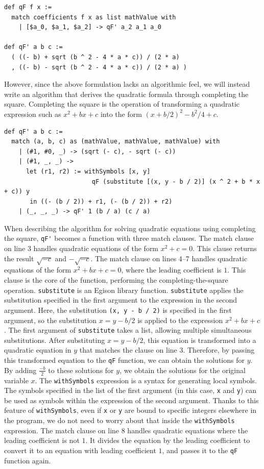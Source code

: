 \begin{lstlisting}[language=egison,numbers=none]
def qF f x :=
  match coefficients f x as list mathValue with
    | [$a_0, $a_1, $a_2] -> qF' a_2 a_1 a_0

def qF' a b c :=
  ( ((- b) + sqrt (b ^ 2 - 4 * a * c)) / (2 * a)
  , ((- b) - sqrt (b ^ 2 - 4 * a * c)) / (2 * a) )
\end{lstlisting}
However, since the above formulation lacks an algorithmic feel, we will instead write an algorithm that derives the quadratic formula through completing the square.
Completing the square is the operation of transforming a quadratic expression such as $x^2 + b x + c$ into the form $(x + b / 2)^2 - b^2 / 4 + c$.
\begin{lstlisting}[language=egison]
def qF' a b c :=
  match (a, b, c) as (mathValue, mathValue, mathValue) with
    | (#1, #0, _) -> (sqrt (- c), - sqrt (- c))
    | (#1, _, _) ->
      let (r1, r2) := withSymbols [x, y]
                        qF (substitute [(x, y - b / 2)] (x ^ 2 + b * x + c)) y
       in ((- (b / 2)) + r1, (- (b / 2)) + r2)
    | (_, _, _) -> qF' 1 (b / a) (c / a)
\end{lstlisting}
When describing the algorithm for solving quadratic equations using completing the square, \lstinline{qF'} becomes a function with three match clauses.
The match clause on line 3 handles quadratic equations of the form $x^2 + c = 0$.
This clause returns the result $\sqrt{-c}$ and $-\sqrt{-c}$.
The match clause on lines 4--7 handles quadratic equations of the form $x^2 + b x + c = 0$, where the leading coefficient is $1$.
This clause is the core of the function, performing the completing-the-square operation.
\lstinline{substitute} is an Egison library function.
\lstinline{substitute} applies the substitution specified in the first argument to the expression in the second argument.
Here, the substitution \lstinline{(x, y - b / 2)} is specified in the first argument, so the substitution $x = y - b / 2$ is applied to the expression $x^2 + b x + c$.
The first argument of \lstinline{substitute} takes a list, allowing multiple simultaneous substitutions.
After substituting $x = y - b / 2$, this equation is transformed into a quadratic equation in $y$ that matches the clause on line 3.
Therefore, by passing this transformed equation to the \lstinline{qF} function, we can obtain the solutions for $y$.
By adding $\frac{-b}{2}$ to these solutions for $y$, we obtain the solutions for the original variable $x$.
The \lstinline{withSymbols} expression is a syntax for generating local symbols.
The symbols specified in the list of the first argument (in this case, \lstinline{x} and \lstinline{y}) can be used as symbols within the expression of the second argument.
Thanks to this feature of \lstinline{withSymbols}, even if \lstinline{x} or \lstinline{y} are bound to specific integers elsewhere in the program, we do not need to worry about that inside the \lstinline{withSymbols} expression.
The match clause on line 8 handles quadratic equations where the leading coefficient is not $1$.
It divides the equation by the leading coefficient to convert it to an equation with leading coefficient $1$, and passes it to the \lstinline{qF} function again.

